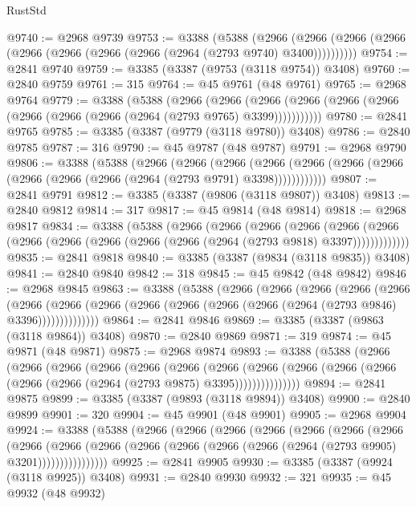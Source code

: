 \begin{lexlean}{RustStd}
\begin{coremodule}
{\begin{coremodule}
{{{{{{{{{{{{{{{{{{{{{{{{{{{{{{{{{@9740 := @2968 @9739
@9753 := @3388
    (@5388
      (@2966 (@2966 (@2966 (@2966 (@2966 (@2966 (@2966 (@2966 (@2964 (@2793 @9740) @3400))))))))))
@9754 := @2841 @9740
@9759 := @3385 (@3387 (@9753 (@3118 @9754)) @3408)
@9760 := @2840 @9759
@9761 := 315
@9764 := @45 @9761 (@48 @9761)
@9765 := @2968 @9764
@9779 := @3388
    (@5388
      (@2966
        (@2966
          (@2966 (@2966 (@2966 (@2966 (@2966 (@2966 (@2966 (@2964 (@2793 @9765) @3399)))))))))))
@9780 := @2841 @9765
@9785 := @3385 (@3387 (@9779 (@3118 @9780)) @3408)
@9786 := @2840 @9785
@9787 := 316
@9790 := @45 @9787 (@48 @9787)
@9791 := @2968 @9790
@9806 := @3388
    (@5388
      (@2966
        (@2966
          (@2966
            (@2966 (@2966 (@2966 (@2966 (@2966 (@2966 (@2966 (@2964 (@2793 @9791) @3398))))))))))))
@9807 := @2841 @9791
@9812 := @3385 (@3387 (@9806 (@3118 @9807)) @3408)
@9813 := @2840 @9812
@9814 := 317
@9817 := @45 @9814 (@48 @9814)
@9818 := @2968 @9817
@9834 := @3388
    (@5388
      (@2966
        (@2966
          (@2966
            (@2966
              (@2966
                (@2966 (@2966 (@2966 (@2966 (@2966 (@2966 (@2964 (@2793 @9818) @3397)))))))))))))
@9835 := @2841 @9818
@9840 := @3385 (@3387 (@9834 (@3118 @9835)) @3408)
@9841 := @2840 @9840
@9842 := 318
@9845 := @45 @9842 (@48 @9842)
@9846 := @2968 @9845
@9863 := @3388
    (@5388
      (@2966
        (@2966
          (@2966
            (@2966
              (@2966
                (@2966
                  (@2966 (@2966 (@2966 (@2966 (@2966 (@2966 (@2964 (@2793 @9846) @3396))))))))))))))
@9864 := @2841 @9846
@9869 := @3385 (@3387 (@9863 (@3118 @9864)) @3408)
@9870 := @2840 @9869
@9871 := 319
@9874 := @45 @9871 (@48 @9871)
@9875 := @2968 @9874
@9893 := @3388
    (@5388
      (@2966
        (@2966
          (@2966
            (@2966
              (@2966
                (@2966
                  (@2966
                    (@2966
                      (@2966 (@2966 (@2966 (@2966 (@2966 (@2964 (@2793 @9875) @3395)))))))))))))))
@9894 := @2841 @9875
@9899 := @3385 (@3387 (@9893 (@3118 @9894)) @3408)
@9900 := @2840 @9899
@9901 := 320
@9904 := @45 @9901 (@48 @9901)
@9905 := @2968 @9904
@9924 := @3388
    (@5388
      (@2966
        (@2966
          (@2966
            (@2966
              (@2966
                (@2966
                  (@2966
                    (@2966
                      (@2966
                        (@2966
                          (@2966 (@2966 (@2966 (@2966 (@2964 (@2793 @9905) @3201))))))))))))))))
@9925 := @2841 @9905
@9930 := @3385 (@3387 (@9924 (@3118 @9925)) @3408)
@9931 := @2840 @9930
@9932 := 321
@9935 := @45 @9932 (@48 @9932)
}}}}}}}}}}}}}}}}}}}}}}}}}}}}}}}}}
\end{coremodule}}
\end{coremodule}
\end{lexlean}
